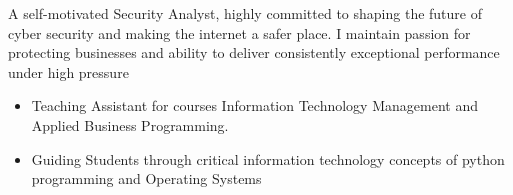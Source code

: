 \documentclass[10pt,a4paper,ragged2e]{altacv}
\begin{document}

\begin{fullwidth}
\makecvheader
\end{fullwidth}

\begin{fullwidth}
A self-motivated Security Analyst, highly committed to shaping the future of cyber security and making the internet a safer place. I maintain passion for protecting businesses and ability to deliver consistently exceptional performance under high pressure
\end{fullwidth}


\smallskip
\divider

\smallskip
{}

\begin{itemize}
\item Teaching Assistant for courses Information Technology Management and Applied Business Programming.
\smallskip
\item Guiding Students through critical information technology concepts of python programming and Operating Systems
\end{itemize}
\end{document}
